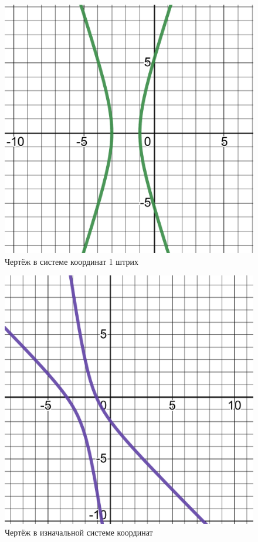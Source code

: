 \documentclass[12pt, a4paper]{article}
\begin{document}
    \begin{figure}[h!]
        \centering
        \includegraphics[width=\textwidth]{resources/1.7_one_stroke.pdf}
        \caption{Чертёж в системе координат 1 штрих}
        \label{fig:main_figure}
    \end{figure}
    \FloatBarrier

    \begin{figure}[h!]
        \centering
        \includegraphics[width=\textwidth]{resources/1.7_original.pdf}
        \caption{Чертёж в изначальной системе координат}
        \label{fig:main_figure}
    \end{figure}
    \FloatBarrier
\end{document}
